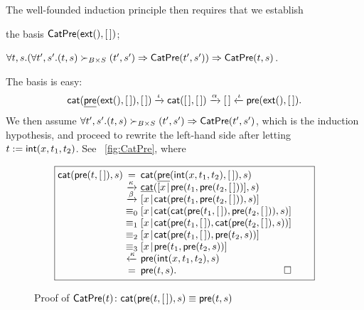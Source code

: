 The well\hyp{}founded induction principle then requires that we
establish
\begin{itemize*}

  \item the basis \(\textsf{CatPre}({\textsf{ext}(),[\,]})\);

  \item \(\forall t,s. (\forall t',s'.(t,s) \succ_{B \times S} (t',s')
    \Rightarrow \textsf{CatPre}({t',s'})) \Rightarrow
    \textsf{CatPre}({t,s})\).

\end{itemize*}
The basis is easy:
\begin{equation*}
  \fun{cat}(\ufun{pre}(\fun{ext}(),\el),\el)
  \xrightarrow{\smash{\iota}} \fun{cat}(\el,\el)
  \xrightarrow{\smash{\alpha}} \el \xleftarrow{\smash{\iota}}
  \fun{pre}(\fun{ext}(),\el).
\index{cat@\fun{cat/2}}
\end{equation*}
We then assume \(\forall t',s'.(t,s) \succ_{B \times S} (t',s')
\Rightarrow \textsf{CatPre}({t',s'})\), which is the induction hypothesis,
and proceed to rewrite the left\hyp{}hand side after letting \(t :=
\textsf{int}(x,t_1,t_2)\). See \fig~\vref{fig:CatPre}, where
\begin{figure}[t]
\begin{equation*}
\boxed{%
\begin{array}{@{}r@{\;}c@{\;}l@{\qquad}}
  \fun{cat}(\fun{pre}(t,\el),s)
& =
& \fun{cat}(\ufun{pre}(\fun{int}(x,t_1,t_2),\el),s)\\
& \xrightarrow{\smash{\kappa}}
& \ufun{cat}(\cons{x}{\fun{pre}(t_1,\fun{pre}(t_2,\el))},s)\\
& \xrightarrow{\smash{\beta}}
& \cons{x}{\fun{cat}(\fun{pre}(t_1,\fun{pre}(t_2,\el)),s)}\\
& \equiv_0
& \cons{x}{\fun{cat}(\fun{cat}(\fun{pre}(t_1,\el),\fun{pre}(t_2,\el)),s)}\\
& \equiv_1
& \cons{x}{\fun{cat}(\fun{pre}(t_1,\el),\fun{cat}(\fun{pre}(t_2,\el),s))}\\
& \equiv_2
& \cons{x}{\fun{cat}(\fun{pre}(t_1,\el),\fun{pre}(t_2,s))}\\
& \equiv_3
& \cons{x}{\fun{pre}(t_1,\fun{pre}(t_2,s))}\\
& \xleftarrow{\smash{\kappa}}
& \fun{pre}(\fun{int}(x,t_1,t_2),s)\\
& =
& \fun{pre}(t,s). \hfill\Box
\end{array}}
\end{equation*}
\caption{Proof of \(\textsf{CatPre}({t}) \colon
  \textsf{cat}(\textsf{pre}(t,[\,]),s) \equiv \textsf{pre}(t,s)\)}
\label{fig:CatPre}
\end{figure}
